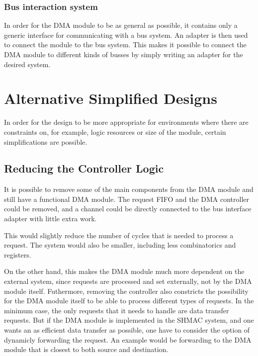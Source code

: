 \subsubsection{Bus interaction system}
In order for the DMA module to be as general as possible, it contains only a generic
interface for communicating with a bus system. An adapter is then used to connect
the module to the bus system. This makes it possible to connect the DMA module to
different kinds of busses by simply writing an adapter for the desired system.


\section{Alternative Simplified Designs} 
In order for the design to be more appropriate for environments where there are
constraints on, for example, logic resources or size of the module, certain simplifications
are possible.


\subsection{Reducing the Controller Logic}
It is possible to remove some of the main components from the DMA module and still
have a functional DMA module. The request FIFO and the DMA controller could be removed,
and a channel could be directly connected to the bus interface adapter with little
extra work.

This would slightly reduce the number of cycles that is needed to process a request.
The system would also be smaller, including less combinatorics and registers.

On the other hand, this makes the DMA module much more dependent on the external system, since requests are processed and set externally, not by the DMA module itself.
Futhermore, removing the controller also constricts the possibility for the DMA module itself to be able to process different types of requests.
In the minimum case, the only requests that it needs to handle are data transfer requests.
But if the DMA module is implemented in the SHMAC system, and one wants an as efficient data transfer as possible, one have to consider the option of dynamicly forwarding the request.
An example would be forwarding to the DMA module that is  closest to both source and destination.

